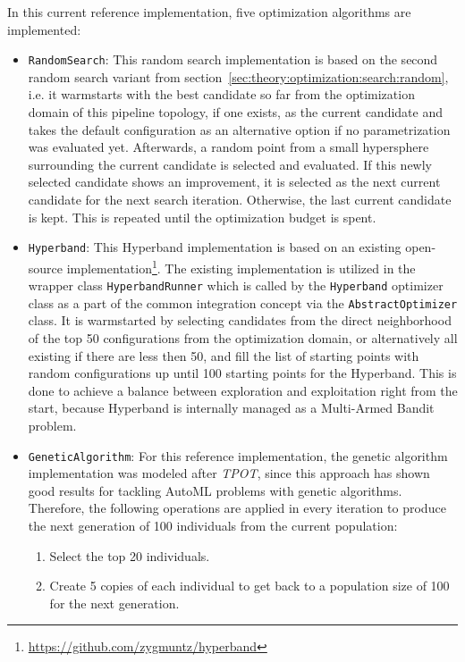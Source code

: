 In this current reference implementation, five optimization algorithms are implemented:
\begin{itemize}
    \item \texttt{RandomSearch}: This random search implementation is based on the second random search variant from section~\ref{sec:theory:optimization:search:random}, i.e. it warmstarts with the best candidate so far from the optimization domain of this pipeline topology, if one exists, as the current candidate and takes the default configuration as an alternative option if no parametrization was evaluated yet.
    Afterwards, a random point from a small hypersphere surrounding the current candidate is selected and evaluated.
    If this newly selected candidate shows an improvement, it is selected as the next current candidate for the next search iteration.
    Otherwise, the last current candidate is kept.
    This is repeated until the optimization budget is spent.
    \item \texttt{Hyperband}: This Hyperband implementation is based on an existing open-source implementation\footnote{\url{https://github.com/zygmuntz/hyperband}}.
    The existing implementation is utilized in the wrapper class \texttt{HyperbandRunner} which is called by the \texttt{Hyperband} optimizer class as a part of the common integration concept via the \texttt{AbstractOptimizer} class.
    It is warmstarted by selecting candidates from the direct neighborhood of the top 50 configurations from the optimization domain, or alternatively all existing if there are less then 50, and fill the list of starting points with random configurations up until 100 starting points for the Hyperband.
    This is done to achieve a balance between exploration and exploitation right from the start, because Hyperband is internally managed as a Multi-Armed Bandit problem.
    \item \texttt{GeneticAlgorithm}: For this reference implementation, the genetic algorithm implementation was modeled after \textit{TPOT}, since this approach has shown good results for tackling AutoML problems with genetic algorithms.
    Therefore, the following operations are applied in every iteration to produce the next generation of 100 individuals from the current population:
        \begin{enumerate}
            \item Select the top 20 individuals.
            \item Create 5 copies of each individual to get back to a population size of 100 for the next generation.

\end{enumerate}
\end{itemize}
